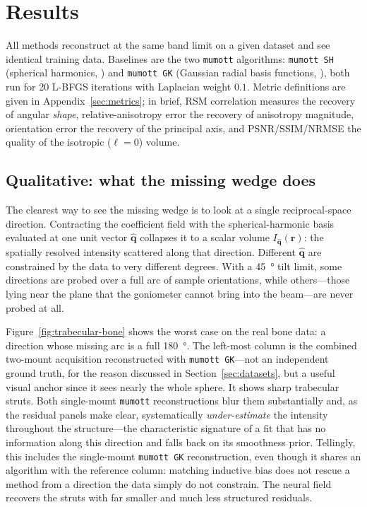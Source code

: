 \documentclass[11pt,a4paper]{article}
\newcommand{\qvec}{\hat{\boldsymbol{q}}}
\newcommand{\rvec}{\boldsymbol{r}}
\begin{document}
\section{Results}
\label{sec:results}

All methods reconstruct at the same band limit on a given dataset and see identical
training data. Baselines are the two \texttt{mumott} algorithms: \texttt{mumott SH}
(spherical harmonics, \citealp{Liebi2018}) and \texttt{mumott GK} (Gaussian radial basis
functions, \citealp{Nielsen2023}), both run for 20 L-BFGS iterations with Laplacian weight
$0.1$. Metric definitions are given in Appendix~\ref{sec:metrics}; in brief, RSM
correlation measures the recovery of angular \emph{shape}, relative-anisotropy error the
recovery of anisotropy magnitude, orientation error the recovery of the principal axis, and
PSNR/SSIM/NRMSE the quality of the isotropic ($\ell=0$) volume.

\subsection{Qualitative: what the missing wedge does}

The clearest way to see the missing wedge is to look at a single reciprocal-space
direction. Contracting the coefficient field with the spherical-harmonic basis evaluated at
one unit vector $\qvec$ collapses it to a scalar volume $I_{\qvec}(\rvec)$: the spatially
resolved intensity scattered along that direction. Different $\qvec$ are constrained by the
data to very different degrees. With a \SI{45}{\degree} tilt limit, some directions are
probed over a full arc of sample orientations, while others---those lying near the plane
that the goniometer cannot bring into the beam---are never probed at all.

Figure~\ref{fig:trabecular-bone} shows the worst case on the real bone data: a direction whose
missing arc is a full \SI{180}{\degree}. The left-most column is the combined two-mount
acquisition reconstructed with \texttt{mumott GK}---not an independent ground truth, for
the reason discussed in Section~\ref{sec:datasets}, but a useful visual anchor since it
sees nearly the whole sphere. It shows sharp trabecular struts. Both single-mount
\texttt{mumott} reconstructions blur them substantially and, as the residual panels make
clear, systematically \emph{under-estimate} the intensity throughout the structure---the
characteristic signature of a fit that has no information along this direction and falls
back on its smoothness prior. Tellingly, this includes the single-mount \texttt{mumott GK}
reconstruction, even though it shares an algorithm with the reference column: matching
inductive bias does not rescue a method from a direction the data simply do not constrain.
The neural field recovers the struts with far smaller and much less structured residuals.
\end{document}
